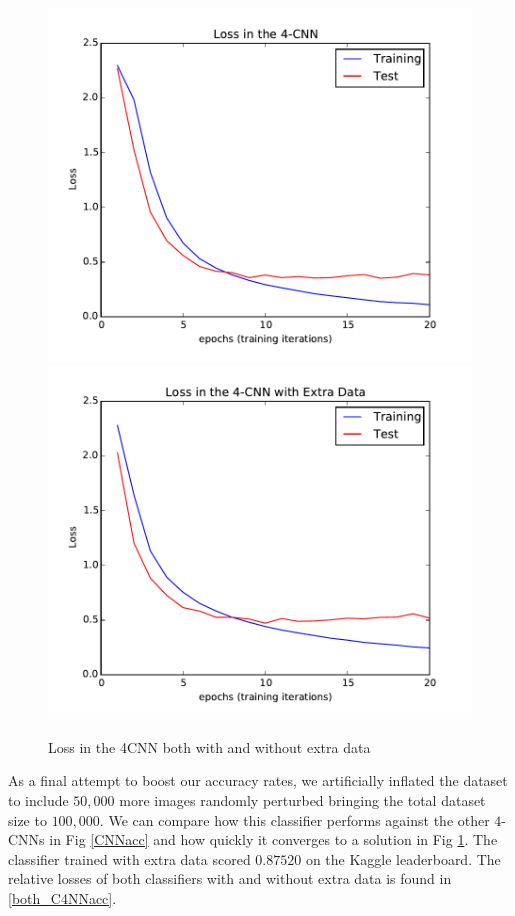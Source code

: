 \documentclass[conference]{IEEEtran}
\begin{document}
\begin{figure}[h]
	\centering
	\includegraphics[scale=0.6]{4CNNloss.pdf}
	\includegraphics[scale=0.6]{4CNN-extra-dataloss.pdf}
	\caption{Loss in the 4CNN both with and without extra data}
	\label{C4NNacc}
\end{figure}

As a final attempt to boost our accuracy rates, we artificially inflated the dataset to include $50,000$ more images randomly perturbed bringing the total dataset size to $100,000$. We can compare how this classifier performs against the other $4$-CNNs in Fig \ref{CNNacc} and how quickly it converges to a solution in Fig \ref{C4NNacc}. The classifier trained with extra data scored $0.87520$ on the Kaggle leaderboard. The relative losses of both classifiers with and without extra data is found in \ref{both_C4NNacc}.
\end{document}
